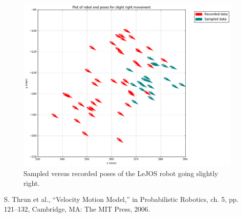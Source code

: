 \documentclass[paper=a4, fontsize=11pt]{scrartcl} %
\begin{document}
    \begin{figure}[H]
        \centering
        \includegraphics[width=1\textwidth]{images/poses_compare_slightRight.png}
        \caption{Sampled versus recorded poses of the LeJOS robot going slightly right.}
    \end{figure}

\begin{thebibliography}{9}
    S. Thrun et al., “Velocity Motion Model,” in Probabilistic Robotics, ch. 5, pp. 121–132, Cambridge,
    MA: The MIT Press, 2006.
\end{thebibliography}
\end{document}
